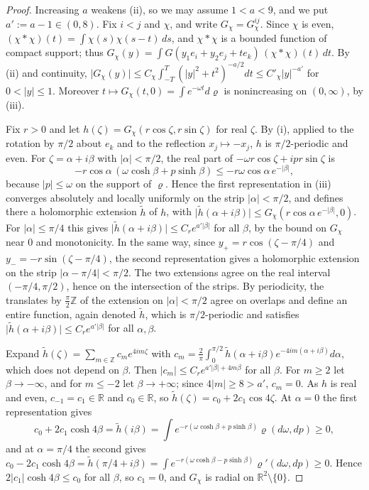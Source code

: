 \documentclass[11pt]{amsart}
\theoremstyle{plain}
\theoremstyle{definition}
\theoremstyle{remark}
\numberwithin{equation}{section}
\newcommand{\R}{\mathbb{R}}
\newcommand{\Z}{\mathbb{Z}}
\newcommand{\abs}[1]{\lvert #1\rvert}
\begin{document}
\begin{proof}
Increasing $a$ weakens (ii), so we may assume $1<a<9$, and we put $a':=a-1\in(0,8)$. Fix $i<j$ and $\chi$, and write $G_\chi=G^{ij}_\chi$. Since $\chi$ is even, $(\chi*\chi)(t)=\int\chi(s)\chi(s-t)\,ds$, and $\chi*\chi$ is a bounded function of compact support; thus $G_\chi(y)=\int G(y_1e_i+y_2e_j+te_k)\,(\chi*\chi)(t)\,dt$. By (ii) and continuity, $\abs{G_\chi(y)}\le C_\chi\int_{-T}^T(\abs y^2+t^2)^{-a/2}dt\le C'_\chi\abs y^{-a'}$ for $0<\abs y\le1$. Moreover $t\mapsto G_\chi(t,0)=\int e^{-\omega t}d\varrho$ is nonincreasing on $(0,\infty)$, by (iii).

Fix $r>0$ and let $h(\zeta)=G_\chi(r\cos\zeta,r\sin\zeta)$ for real $\zeta$. By (i), applied to the rotation by $\pi/2$ about $e_k$ and to the reflection $x_j\mapsto-x_j$, $h$ is $\pi/2$-periodic and even. For $\zeta=\alpha+i\beta$ with $\abs\alpha<\pi/2$, the real part of $-\omega r\cos\zeta+ipr\sin\zeta$ is
\[
-r\cos\alpha\,(\omega\cosh\beta+p\sinh\beta)\le-r\omega\cos\alpha\,e^{-\abs\beta},
\]
because $\abs p\le\omega$ on the support of $\varrho$. Hence the first representation in (iii) converges absolutely and locally uniformly on the strip $\abs\alpha<\pi/2$, and defines there a holomorphic extension $\tilde h$ of $h$, with $\abs{\tilde h(\alpha+i\beta)}\le G_\chi(r\cos\alpha\,e^{-\abs\beta},0)$. For $\abs\alpha\le\pi/4$ this gives $\abs{\tilde h(\alpha+i\beta)}\le C_re^{a'\abs\beta}$ for all $\beta$, by the bound on $G_\chi$ near $0$ and monotonicity. In the same way, since $y_+=r\cos(\zeta-\pi/4)$ and $y_-=-r\sin(\zeta-\pi/4)$, the second representation gives a holomorphic extension on the strip $\abs{\alpha-\pi/4}<\pi/2$. The two extensions agree on the real interval $(-\pi/4,\pi/2)$, hence on the intersection of the strips. By periodicity, the translates by $\frac\pi2\Z$ of the extension on $\abs\alpha<\pi/2$ agree on overlaps and define an entire function, again denoted $\tilde h$, which is $\pi/2$-periodic and satisfies $\abs{\tilde h(\alpha+i\beta)}\le C_re^{a'\abs\beta}$ for all $\alpha,\beta$.

Expand $\tilde h(\zeta)=\sum_{m\in\Z}c_me^{4im\zeta}$ with $c_m=\frac2\pi\int_0^{\pi/2}\tilde h(\alpha+i\beta)e^{-4im(\alpha+i\beta)}d\alpha$, which does not depend on $\beta$. Then $\abs{c_m}\le C_re^{a'\abs\beta+4m\beta}$ for all $\beta$. For $m\ge2$ let $\beta\to-\infty$, and for $m\le-2$ let $\beta\to+\infty$; since $4\abs m\ge8>a'$, $c_m=0$. As $h$ is real and even, $c_{-1}=c_1\in\R$ and $c_0\in\R$, so $\tilde h(\zeta)=c_0+2c_1\cos4\zeta$. At $\alpha=0$ the first representation gives
\[
c_0+2c_1\cosh4\beta=\tilde h(i\beta)=\int e^{-r(\omega\cosh\beta+p\sinh\beta)}\varrho(d\omega,dp)\ge0 ,
\]
and at $\alpha=\pi/4$ the second gives $c_0-2c_1\cosh4\beta=\tilde h(\pi/4+i\beta)=\int e^{-r(\omega\cosh\beta-p\sinh\beta)}\varrho'(d\omega,dp)\ge0$. Hence $2\abs{c_1}\cosh4\beta\le c_0$ for all $\beta$, so $c_1=0$, and $G_\chi$ is radial on $\R^2\setminus\{0\}$.


\end{proof}
\end{document}
